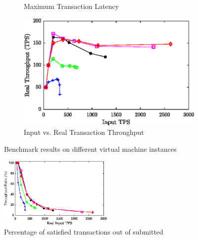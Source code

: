 \documentclass[conference]{IEEEtran}
\begin{document}
\begin{figure}
\begin{subfigure}{0.99\columnwidth}
\caption{Maximum Transaction Latency}%
\label{latency_max}%
\end{subfigure}\hfill%
\begin{subfigure}{0.99\columnwidth}
\includegraphics[width=\columnwidth]{figs/tpsLoad.eps}
\caption{Input vs. Real Transaction Throughput}
\label{fig:TPS}
\end{subfigure}\hfill%
\caption{Benchmark results on different virtual machine instances}
\label{latency}%
\end{figure}



\begin{figure}
    \centering
    \includegraphics[width=0.49\textwidth]{figs/percentage.eps}
    \caption{Percentage of satisfied transactions out of submitted}
    \label{fig:cpu}
\end{figure}
\end{document}

